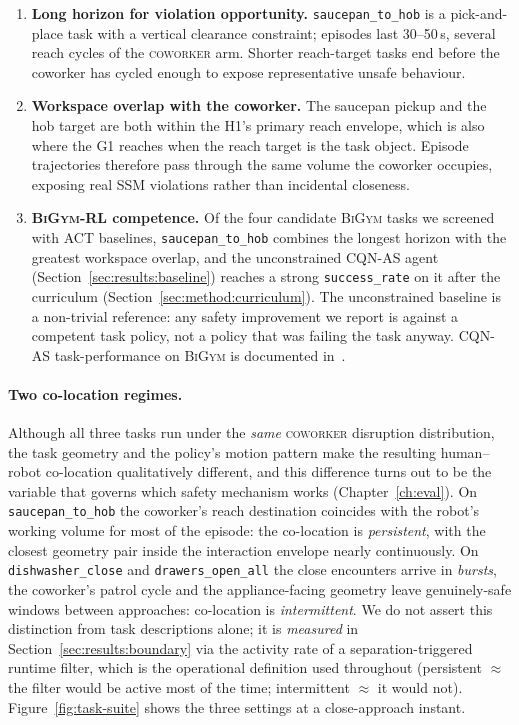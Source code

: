 \documentclass[11pt,a4paper]{report}
\newcommand{\ssm}{SSM}
\newcommand{\bigym}{\textsc{BiGym}}
\newcommand{\cqnas}{CQN-AS}
\newcommand{\coworker}{\textsc{coworker}}
\begin{document}
\begin{enumerate}[topsep=2pt,itemsep=2pt]
\item \textbf{Long horizon for violation opportunity.}
  \texttt{saucepan\_to\_hob} is a pick-and-place task with a
  vertical clearance constraint; episodes last 30--50\,s, several
  reach cycles of the \coworker{} arm. Shorter reach-target tasks
  end before the coworker has cycled enough to expose representative
  unsafe behaviour.
\item \textbf{Workspace overlap with the coworker.} The saucepan
  pickup and the hob target are both within the H1's primary
  reach envelope, which is also where the G1 reaches when the
  reach target is the task object. Episode trajectories therefore
  pass through the same volume the coworker occupies, exposing
  real \ssm{} violations rather than incidental closeness.
\item \textbf{\bigym{}-RL competence.} Of the four candidate
  \bigym{} tasks we screened with ACT baselines, \texttt{saucepan\_to\_hob}
  combines the longest horizon with the greatest workspace overlap,
  and the unconstrained \cqnas{} agent
  (Section~\ref{sec:results:baseline}) reaches a strong
  \texttt{success\_rate} on it after the curriculum
  (Section~\ref{sec:method:curriculum}). The unconstrained baseline
  is a non-trivial reference: any safety improvement we report is
  against a competent task policy, not a policy that was failing the
  task anyway. \cqnas{} task-performance on \bigym{} is documented
  in~\cite{seo2024cqnas}.
\end{enumerate}

\paragraph{Two co-location regimes.}
Although all three tasks run under the \emph{same} \coworker{}
disruption distribution, the task geometry and the policy's motion
pattern make the resulting human--robot co-location qualitatively
different, and this difference turns out to be the variable that
governs which safety mechanism works (Chapter~\ref{ch:eval}). On
\texttt{saucepan\_to\_hob} the coworker's reach destination coincides
with the robot's working volume for most of the episode: the
co-location is \emph{persistent}, with the closest geometry pair
inside the interaction envelope nearly continuously. On
\texttt{dishwasher\_close} and \texttt{drawers\_open\_all} the close
encounters arrive in \emph{bursts}, the coworker's patrol cycle and
the appliance-facing geometry leave genuinely-safe windows between
approaches: co-location is \emph{intermittent}. We do not assert this
distinction from task descriptions alone; it is \emph{measured} in
Section~\ref{sec:results:boundary} via the activity rate of a
separation-triggered runtime filter, which is the operational
definition used throughout (persistent $\approx$ the filter would be
active most of the time; intermittent $\approx$ it would not).
Figure~\ref{fig:task-suite} shows the three settings at a
close-approach instant.
\end{document}

